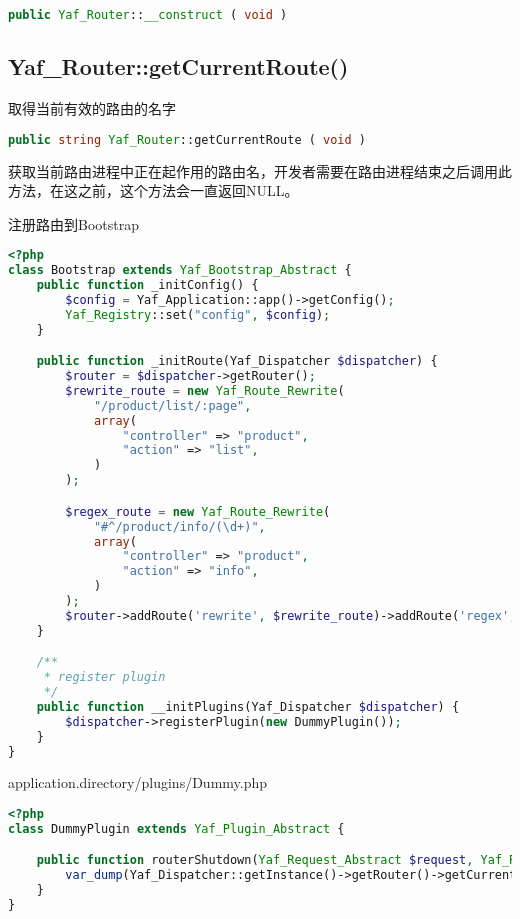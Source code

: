 \begin{lstlisting}[language=PHP]
public Yaf_Router::__construct ( void )
\end{lstlisting}


\subsection{Yaf\_Router::getCurrentRoute()}

取得当前有效的路由的名字


\begin{lstlisting}[language=PHP]
public string Yaf_Router::getCurrentRoute ( void )
\end{lstlisting}

获取当前路由进程中正在起作用的路由名，开发者需要在路由进程结束之后调用此方法，在这之前，这个方法会一直返回NULL。

\begin{example}
注册路由到Bootstrap
\begin{lstlisting}[language=PHP]
<?php
class Bootstrap extends Yaf_Bootstrap_Abstract {
    public function _initConfig() {
        $config = Yaf_Application::app()->getConfig();
        Yaf_Registry::set("config", $config);
    }

    public function _initRoute(Yaf_Dispatcher $dispatcher) {
        $router = $dispatcher->getRouter();
        $rewrite_route = new Yaf_Route_Rewrite(
            "/product/list/:page",
            array(
                "controller" => "product",
                "action" => "list",
            )
        );

        $regex_route = new Yaf_Route_Rewrite(
            "#^/product/info/(\d+)",
            array(
                "controller" => "product",
                "action" => "info",
            )
        );
        $router->addRoute('rewrite', $rewrite_route)->addRoute('regex', $regex_route);
    }

    /**
     * register plugin
     */
    public function __initPlugins(Yaf_Dispatcher $dispatcher) {
        $dispatcher->registerPlugin(new DummyPlugin());
    }
}
\end{lstlisting}
\end{example}


\begin{example}
application.directory/plugins/Dummy.php
\begin{lstlisting}[language=PHP]
<?php
class DummyPlugin extends Yaf_Plugin_Abstract {

    public function routerShutdown(Yaf_Request_Abstract $request, Yaf_Response_Abstract $response) {
        var_dump(Yaf_Dispatcher::getInstance()->getRouter()->getCurrentRoute());
    }
}
\end{lstlisting}
\end{example}


